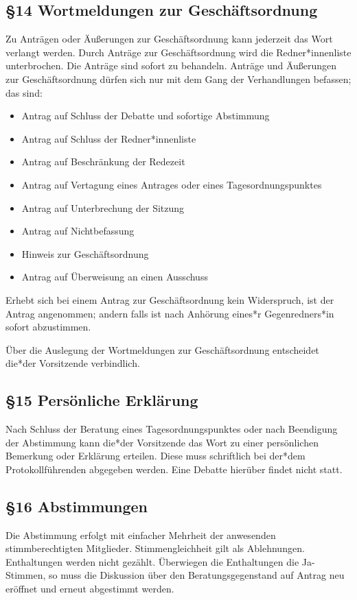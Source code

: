 \documentclass[12pt]{report}
\begin{document}
\begin{flushleft}
\subsection*{§14 Wortmeldungen zur Geschäftsordnung}
Zu Anträgen oder Äußerungen zur Geschäftsordnung kann jederzeit das Wort verlangt werden.
Durch Anträge zur Geschäftsordnung wird die {\color{red}Redner*innenliste} unterbrochen. Die Anträge sind sofort zu
behandeln. Anträge und Äußerungen zur Geschäftsordnung dürfen sich nur mit dem Gang der Verhandlungen
befassen; das sind:

\begin{itemize}
  \item Antrag auf Schluss der Debatte und sofortige Abstimmung
  \item Antrag auf Schluss der {\color{red}Redner*innenliste}
  \item Antrag auf Beschränkung der Redezeit
  \item Antrag auf Vertagung eines Antrages oder eines Tagesordnungspunktes
  \item Antrag auf Unterbrechung der Sitzung
  \item Antrag auf Nichtbefassung
  \item Hinweis zur Geschäftsordnung
  \item Antrag auf Überweisung an einen Ausschuss
\end{itemize}

Erhebt sich bei einem Antrag zur Geschäftsordnung kein Widerspruch, ist der Antrag angenommen; andern
falls ist nach Anhörung {\color{red}eines*r Gegenredners*in} sofort abzustimmen.

Über die Auslegung der Wortmeldungen zur Geschäftsordnung entscheidet {\color{red}die*der} Vorsitzende verbindlich.


\subsection*{§15 Persönliche Erklärung}
Nach Schluss der Beratung eines Tagesordnungspunktes oder nach Beendigung der Abstimmung kann {\color{red}die*der}
Vorsitzende das Wort zu einer persönlichen Bemerkung oder Erklärung erteilen. Diese muss schriftlich bei
{\color{red}der*dem} Protokollführenden abgegeben werden. Eine Debatte hierüber findet nicht statt.
\subsection*{§16 Abstimmungen}
Die Abstimmung erfolgt mit einfacher Mehrheit der anwesenden stimmberechtigten Mitglieder.
Stimmengleichheit gilt als Ablehnungen. Enthaltungen werden nicht gezählt. Überwiegen die Enthaltungen die 
Ja-Stimmen, so muss die Diskussion über den Beratungsgegenstand auf Antrag neu eröffnet und erneut
abgestimmt werden.


\end{flushleft}
\end{document}
